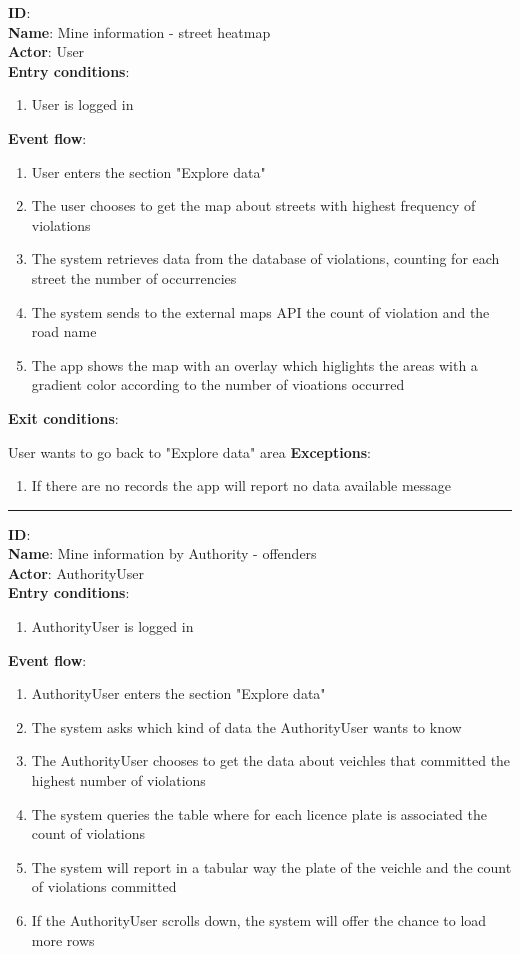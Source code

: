   
	\textbf{ID}:  \\
	\textbf{Name}: Mine information - street heatmap \\
	\textbf{Actor}: User  \\
	\textbf{Entry conditions}:
	\begin{enumerate}
		\item{User is logged in}
	\end{enumerate}
	\textbf{Event flow}:
	\begin{enumerate}
		\item{User enters the section "Explore data"}
    \item{The user chooses to get the map about streets with highest frequency of violations}
    \item{The system retrieves data from the database of violations, counting for each street the number of occurrencies}
    \item{The system sends to the external maps API the count of violation and the road name}
    \item{The app shows the map with an overlay which higlights the areas with a gradient color according to the number of vioations occurred}
	\end{enumerate}
	\textbf{Exit conditions}:
        \item{User wants to go back to "Explore data" area}
	\textbf{Exceptions}:
  \begin{enumerate}
    \item{If there are no records the app will report no data available message}
  \end{enumerate}
	\rule{\linewidth}{0.4pt}
	\textbf{ID}:  \\
	\textbf{Name}: Mine information by Authority - offenders \\
	\textbf{Actor}: AuthorityUser   \\
	\textbf{Entry conditions}:
	\begin{enumerate}
		\item{AuthorityUser is logged in}
	\end{enumerate}
	\textbf{Event flow}:
	\begin{enumerate}
		\item{AuthorityUser enters the section "Explore data"}
		\item{The system asks which kind of data the AuthorityUser wants to know}
    \item{The AuthorityUser chooses to get the data about veichles that committed the highest number of violations}
    \item{The system queries the table where for each licence plate is associated the count of violations }
    \item{The system will report in a tabular way the plate of the veichle and the count of violations committed}
    \item{If the AuthorityUser scrolls down, the system will offer the chance to load more rows}
	\end{enumerate}
